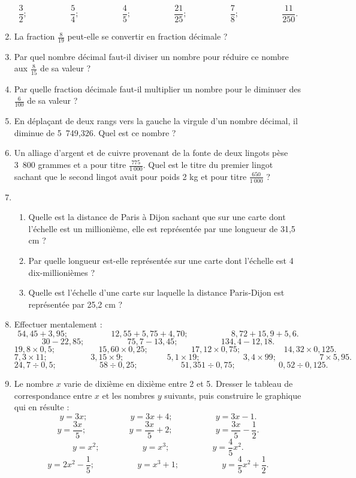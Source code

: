 \documentclass[12 pt]{extarticle}
\theoremstyle{plain}
\begin{document}
\begin{enumerate}
 \[\frac32; \phantom{meowmeow}
 \frac54; \phantom{meowmeow}
 \frac45; \phantom{meowmeow}
 \frac{21}{25};\phantom{meowmeow}
 \frac78; \phantom{meowmeow}
 \frac{11}{250}.\]
 \item La fraction $\frac8{19}$ peut-elle se convertir en fraction décimale ?
 \item Par quel nombre décimal faut-il diviser un nombre pour réduire ce 
 nombre aux $\frac8{15}$ de sa valeur ? 
 \item Par quelle fraction décimale faut-il multiplier un nombre pour 
 le diminuer des $\frac6{100}$ de sa valeur ? 
 \item En déplaçant de deux rangs vers la gauche la virgule d'un nombre décimal, il diminue de 5~749,326. Quel est ce nombre ? 
 \item Un alliage d'argent et de cuivre provenant de la fonte de deux lingots
 pèse 3~800 grammes et a pour titre $\frac{775}{1~000}$. Quel est le titre du 
 premier lingot sachant que le second lingot avait pour poids 2 kg et pour titre $\frac{650}{1~000}$ ? 
 \item 
 \begin{enumerate}
 \item Quelle est la distance de Paris à Dijon sachant que sur une carte dont 
 l'échelle est un millionième, elle est représentée par une longueur de 31,5 cm ? 
 \item Par quelle longueur est-elle représentée sur une carte dont l'échelle est 4 dix-millionièmes ? 
 \item Quelle est l'échelle d'une carte sur laquelle la distance Paris-Dijon est représentée par 25,2 cm ? \end{enumerate}
 \item Effectuer mentalement : 
 \[ 54,45+ 3,95 ; \phantom{meowmeow} 12,55 + 5,75+ 4,70 ; \phantom{meowmeow} 
 8,72 + 15,9 + 5,6.\]
 \[ 30 - 22,85 ; \phantom{meowmeow} 75,7 - 13,45 ;\phantom{meowmeow} 134,4 - 12,18.\]
 \[ 19,8 \times 0,5 ; \phantom{meowmeow} 15,60\times 0,25 ; \phantom{meowmeow} 17,12 \times 0,75 ; \phantom{meowmeow} 14,32\times 0,125.\]
 \[ 7,3 \times 11; \phantom{meowmeow}3,15 \times 9 ; 
 \phantom{meowmeow} 5,1 \times 19 ; \phantom{meowmeow}
 3,4 \times 99 ; \phantom{meowmeow} 7 \times 5,95.\]
 \[ 24,7 \div 0,5 ; \phantom{meowmeow} 58 \div 0,25 ; \phantom{meowmeow}
 51,351\div 0,75; \phantom{meowmeow} 0,52 \div 0,125.\]
 \item Le nombre $x$ varie de dixième en dixième entre 2 et 5. Dresser le tableau de correspondance entre $x$ et les nombres $y$ suivants, puis construire le graphique qui en résulte : 
 \[ y = 3x; \phantom{meowmeow} y = 3x+4; \phantom{meowmeow} y=3x-1.\]
 \[ y = \frac{3x}5; \phantom{meowmeow}y = \frac{3x}5 + 2; \phantom{meowmeow}
 y = \frac{3x}5 - \frac12.\]
 \[ y = x^2; \phantom{meowmeow} y = x^3; \phantom{meowmeow} y = \frac45x^2.\]
 \[ y = 2x^2 - \frac15; \phantom{meowmeow} 
 y = x^3 + 1; \phantom{meowmeow} y = \frac45 x^2 + \frac12.\]
 
 \end{enumerate}
 
\end{document}
